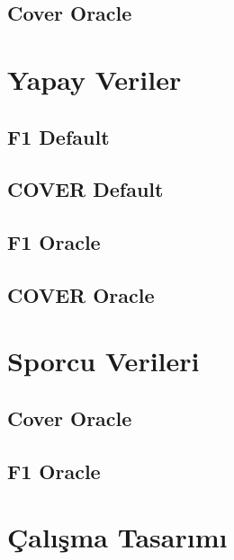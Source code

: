 \documentclass[12pt,twoside]{deuthesis}
\begin{document}
\hypertarget{cover-oracle}{%
\subsection{Cover Oracle}\label{cover-oracle}}

\hypertarget{yapay-veriler}{%
\section{Yapay Veriler}\label{yapay-veriler}}

\hypertarget{f1-default-1}{%
\subsection{F1 Default}\label{f1-default-1}}

\hypertarget{cover-default-1}{%
\subsection{COVER Default}\label{cover-default-1}}

\hypertarget{f1-oracle-1}{%
\subsection{F1 Oracle}\label{f1-oracle-1}}

\hypertarget{cover-oracle-1}{%
\subsection{COVER Oracle}\label{cover-oracle-1}}

\hypertarget{sporcu-verileri}{%
\section{Sporcu Verileri}\label{sporcu-verileri}}

\hypertarget{cover-oracle-2}{%
\subsection{Cover Oracle}\label{cover-oracle-2}}

\hypertarget{f1-oracle-2}{%
\subsection{F1 Oracle}\label{f1-oracle-2}}

\hypertarget{uxe7alux131ux15fma-tasarux131mux131}{%
\section{Çalışma Tasarımı}\label{uxe7alux131ux15fma-tasarux131mux131}}
\end{document}
